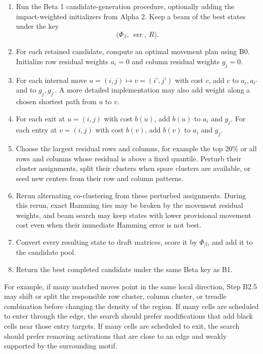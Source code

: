 \documentclass[11pt]{article}
\begin{document}
\begin{enumerate}[label=\textbf{B2.\arabic*.}]
  \item Run the Beta 1 candidate-generation procedure, optionally adding the
  impact-weighted initializers from Alpha 2. Keep a beam of the best states
  under the key
  \[
    \bigl(\Phi_\beta,\ \operatorname{err},\ R\bigr).
  \]

  \item For each retained candidate, compute an optimal movement plan using
  B0. Initialize row residual weights \(a_i=0\) and column residual weights
  \(g_j=0\).

  \item For each internal move \(u=(i,j)\mapsto v=(i',j')\) with cost \(c\),
  add \(c\) to \(a_i,a_{i'}\) and to \(g_j,g_{j'}\). A more detailed
  implementation may also add weight along a chosen shortest path from \(u\) to
  \(v\).

  \item For each exit at \(u=(i,j)\) with cost \(b(u)\), add \(b(u)\) to
  \(a_i\) and \(g_j\). For each entry at \(v=(i,j)\) with cost \(b(v)\), add
  \(b(v)\) to \(a_i\) and \(g_j\).

  \item Choose the largest residual rows and columns, for example the top
  \(20\%\) or all rows and columns whose residual is above a fixed quantile.
  Perturb their cluster assignments, split their clusters when spare clusters
  are available, or seed new centers from their row and column patterns.

  \item Rerun alternating co-clustering from these perturbed assignments. During
  this rerun, exact Hamming ties may be broken by the movement residual weights,
  and beam search may keep states with lower provisional movement cost even
  when their immediate Hamming error is not best.

  \item Convert every resulting state to draft matrices, score it by
  \(\Phi_\beta\), and add it to the candidate pool.

  \item Return the best completed candidate under the same Beta key as B1.
\end{enumerate}

For example, if many matched moves point in the same local direction, Step B2.5
may shift or split the responsible row cluster, column cluster, or treadle
combination before changing the density of the region. If many cells are
scheduled to enter through the edge, the search should prefer modifications
that add black cells near those entry targets. If many cells are scheduled to
exit, the search should prefer removing activations that are close to an edge
and weakly supported by the surrounding motif.
\end{document}
